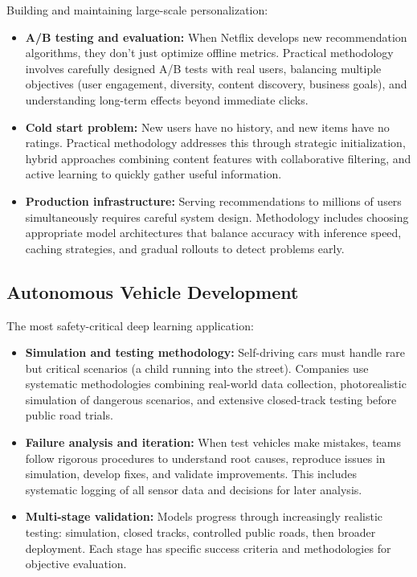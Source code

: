 Building and maintaining large-scale personalization:

\begin{itemize}
    \item \textbf{A/B testing and evaluation:} When Netflix develops new recommendation algorithms, they don't just optimize offline metrics. Practical methodology involves carefully designed A/B tests with real users, balancing multiple objectives (user engagement, diversity, content discovery, business goals), and understanding long-term effects beyond immediate clicks.
    
    \item \textbf{Cold start problem:} New users have no history, and new items have no ratings. Practical methodology addresses this through strategic initialization, hybrid approaches combining content features with collaborative filtering, and active learning to quickly gather useful information.
    
    \item \textbf{Production infrastructure:} Serving recommendations to millions of users simultaneously requires careful system design. Methodology includes choosing appropriate model architectures that balance accuracy with inference speed, caching strategies, and gradual rollouts to detect problems early.
\end{itemize}

\subsection{Autonomous Vehicle Development}

The most safety-critical deep learning application:

\begin{itemize}
    \item \textbf{Simulation and testing methodology:} Self-driving cars must handle rare but critical scenarios (a child running into the street). Companies use systematic methodologies combining real-world data collection, photorealistic simulation of dangerous scenarios, and extensive closed-track testing before public road trials.
    
    \item \textbf{Failure analysis and iteration:} When test vehicles make mistakes, teams follow rigorous procedures to understand root causes, reproduce issues in simulation, develop fixes, and validate improvements. This includes systematic logging of all sensor data and decisions for later analysis.
    
    \item \textbf{Multi-stage validation:} Models progress through increasingly realistic testing: simulation, closed tracks, controlled public roads, then broader deployment. Each stage has specific success criteria and methodologies for objective evaluation.
\end{itemize}

